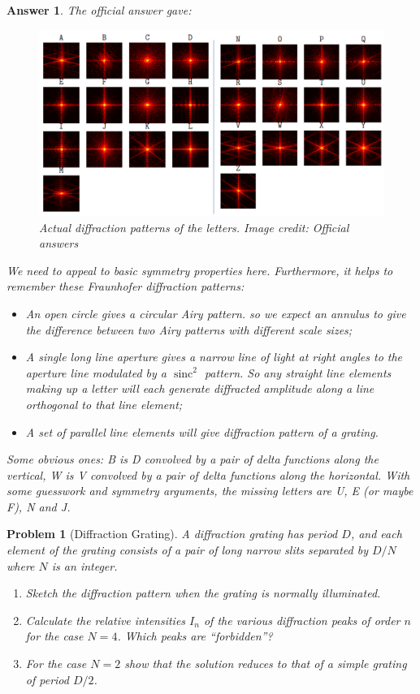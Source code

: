 \documentclass[a4paper]{article}
\DeclareMathOperator{\sinc}{sinc}
\newtheorem{ans}{Answer}[section]
\theoremstyle{new}
\newtheorem{qns}{Problem}[section]
\begin{document}
\begin{ans}
The official answer gave:
\begin{figure}[H]
    \centering
    \includegraphics[width=\linewidth]{2_25a.PNG}
    \caption{Actual diffraction patterns of the letters. Image credit: Official answers}
\end{figure}
We need to appeal to basic symmetry properties here. Furthermore, it helps to remember these Fraunhofer diffraction patterns:
\begin{itemize}
    \item An open circle gives a circular Airy pattern. so we expect an annulus to give the difference between two Airy patterns with different scale sizes;
    \item A single long line aperture gives a narrow line of light at right angles to the aperture line modulated by a $\sinc^2$ pattern. So any straight line elements making up a letter will each generate diffracted amplitude along a line orthogonal to that line element;
    \item A set of parallel line elements will give diffraction pattern of a grating.
\end{itemize}
Some obvious ones: B is D convolved by a pair of delta functions along the vertical, W is V convolved by a pair of delta functions along the horizontal. With some guesswork and symmetry arguments, the missing letters are U, E (or maybe F), N and J.
\end{ans}
\newpage
\begin{qns}[Diffraction Grating]
A diffraction grating has period $D$, and each element of the grating consists of a pair of long narrow slits separated by $D/N$ where $N$ is an integer.
\begin{enumerate}[label=(\alph*)]
\item Sketch the diffraction pattern when the grating is normally illuminated.
\item Calculate the relative intensities $I_n$ of the various diffraction peaks of order $n$ for the case $N = 4$. Which peaks are “forbidden”?
\item For the case $N = 2$ show that the solution reduces to that of a simple grating of period $D/2$.
\end{enumerate}
\end{qns}
\end{document}
